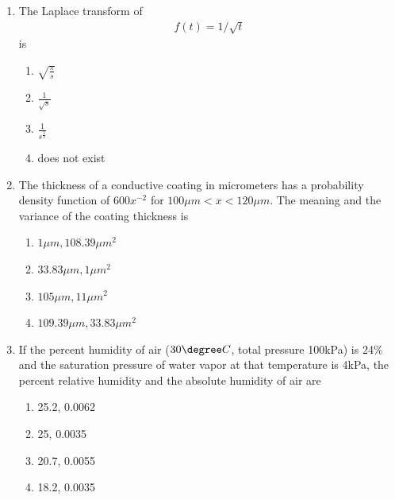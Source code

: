 \documentclass[journal,12pt,onecolumn]{IEEEtran}
\theoremstyle{remark}
\begin{document}
\begin{enumerate}
    \item The Laplace transform of
    \begin{align*}
        f(t)=1/\sqrt{t}
    \end{align*}
    is
    \begin{multicols}{4}
        \begin{enumerate}
            \item $\sqrt{\frac{\pi}{s}}$
            \item $\frac{1}{\sqrt{s}}$
            \item $\frac{1}{s^{\frac{3}{2}}}$
            \item does not exist
        \end{enumerate}
    \end{multicols}
    
    \item The thickness of a conductive coating in micrometers has a probability density function of $600x^{-2}$ for $100\mu m<x<120\mu m$. The meaning and the variance of the coating thickness is

    \begin{multicols}{2}
        \begin{enumerate}
            \item $1\mu m,108.39\mu m^2$
            \item $33.83\mu m,1\mu m^2$
            \item $105\mu m,11\mu m^2$
            \item $109.39\mu m,33.83\mu m^2$
        \end{enumerate}
    \end{multicols}

    \item If the percent humidity of air ($30\degree C$, total pressure 100kPa) is 24\% and the saturation pressure of water vapor at that temperature is 4kPa, the percent relative humidity and the absolute humidity of air are

    \begin{multicols}{4}
        \begin{enumerate}
            \item 25.2, 0.0062
            \item 25, 0.0035
            \item 20.7, 0.0055
            \item 18.2, 0.0035
        \end{enumerate}
    \end{multicols}


\end{enumerate}
\end{document}
